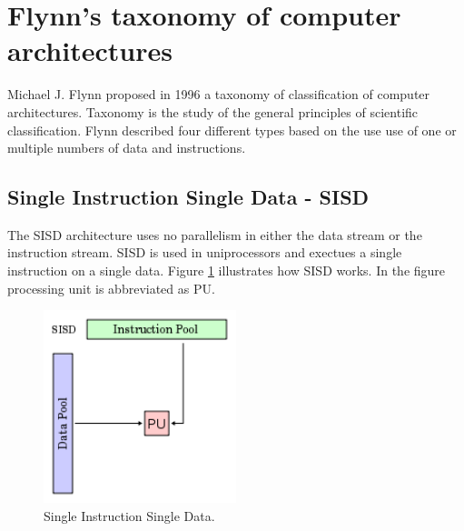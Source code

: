 \section{Flynn's taxonomy of computer architectures}
Michael J. Flynn proposed in 1996 a taxonomy of classification of computer architectures. Taxonomy is the study of the general principles of scientific classification. Flynn described four different types based on the use use of one or multiple numbers of data and instructions.
 
\subsection*{Single Instruction Single Data - SISD}
The SISD architecture uses no parallelism in either the data stream or the instruction stream. SISD is used in uniprocessors and exectues a single instruction on a single data. Figure \ref{SISD} illustrates how SISD works. In the figure processing unit is abbreviated as PU.
\begin{figure}[h!]
\centering
\includegraphics[width=0.50\textwidth]{parallel/SISD}
\caption{Single Instruction Single Data.}
\label{SISD}
\end{figure}


